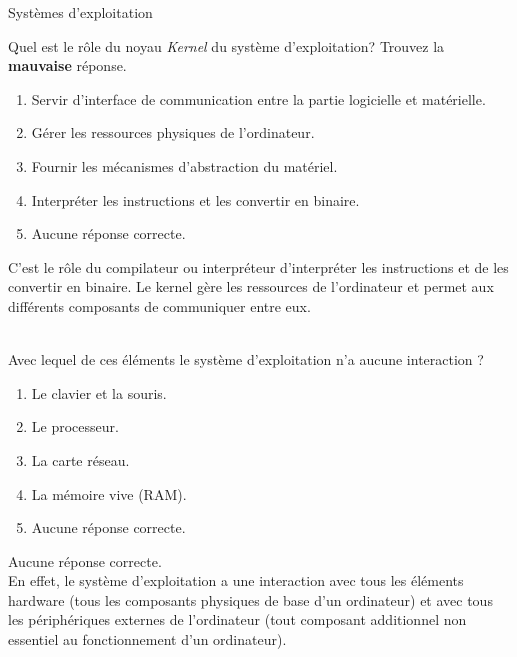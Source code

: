 \begin{section}{Systèmes d'exploitation}
    \begin{Exercice}[2 minutes]
        Quel est le rôle du noyau \textit{Kernel} du système d'exploitation? Trouvez la \textbf{mauvaise} réponse.
        \begin{enumerate}
            \item Servir d'interface de communication entre la partie logicielle et matérielle.
            \item Gérer les ressources physiques de l'ordinateur.
            \item Fournir les mécanismes d'abstraction du matériel.
            \item Interpréter les instructions et les convertir en binaire.
            \item Aucune réponse correcte.
        \end{enumerate}
    \end{Exercice}
    \begin{solution}
                C'est le rôle du compilateur ou interpréteur d'interpréter les instructions et de les convertir en binaire. Le kernel gère les ressources de l'ordinateur et permet aux différents composants de communiquer entre eux.
    \end{solution}
    
    \begin{Exercice}[2 minutes]\\
    Avec lequel de ces éléments le système d'exploitation n'a aucune interaction ?
        \begin{enumerate}
            \item Le clavier et la souris.
            \item Le processeur.
            \item La carte réseau.
            \item La mémoire vive (RAM).
            \item Aucune réponse correcte.
        \end{enumerate}
    \end{Exercice}
    \begin{solution}
            Aucune réponse correcte. \\
        
	    En effet, le système d'exploitation a une interaction avec tous les éléments hardware (tous les composants physiques de base d'un ordinateur) et avec tous les périphériques externes de l'ordinateur (tout composant additionnel non essentiel au fonctionnement d'un ordinateur).  \\
    \end{solution}


\end{section}

